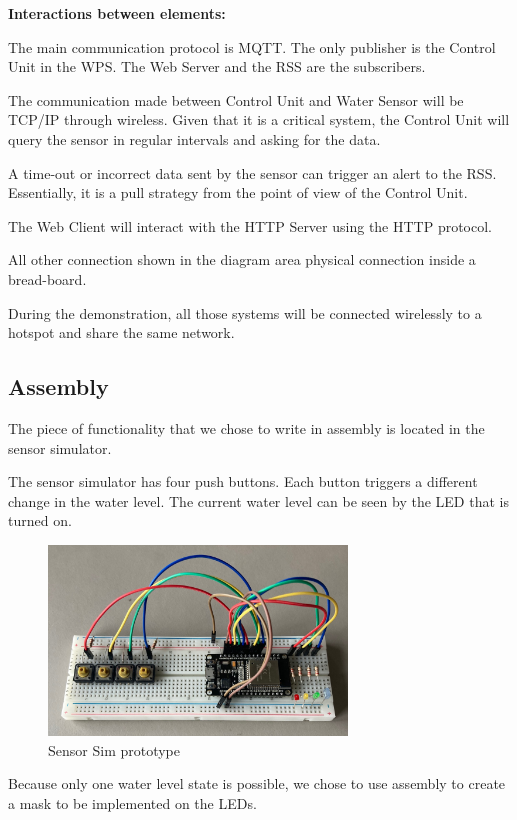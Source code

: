 \documentclass[11pt]{article}
\begin{document}
\textbf{Interactions between elements:}

The main communication protocol is MQTT. The only publisher is the Control Unit in the WPS. The Web Server and the RSS are the subscribers.

The communication made between Control Unit and Water Sensor will be TCP/IP through wireless. Given that it is a critical system, the Control Unit will query the sensor in regular intervals and asking for the data.

A time-out or incorrect data sent by the sensor can trigger an alert to the RSS. Essentially, it is a pull strategy from the point of view of the Control Unit.

The Web Client will interact with the HTTP Server using the HTTP protocol.

All other connection shown in the diagram area physical connection inside a bread-board.

During the demonstration, all those systems will be connected wirelessly to a hotspot and share the same network.

\newpage
\subsection{Assembly}

The piece of functionality that we chose to write in assembly is located in the sensor simulator.

The sensor simulator has four push buttons. Each button triggers a different change in the water level. 
The current water level can be seen by the LED that is turned on.

\begin{figure}[H]
  \centering
  \includegraphics[width=300px]{../diagrams/sensor-sim-01.jpg}
  \caption{Sensor Sim prototype}
  \label{fig:Sensor sim prototype}
\end{figure}

Because only one water level state is possible, we chose to use assembly to create a mask to be implemented on the LEDs.
\end{document}
